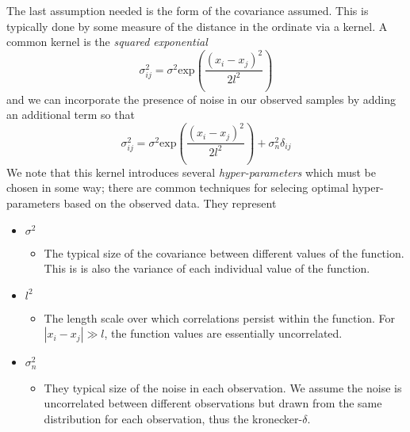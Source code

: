 \documentclass{article}
\begin{document}
The last assumption needed is the form of the covariance assumed. 
This is typically done by some measure of the distance in the ordinate via a kernel.
A common kernel is the \textit{squared exponential}
\begin{equation}
    \sigma_{ij}^2 = \sigma^2 \mathrm{exp}\left(\frac{(x_i - x_j)^2}{2l^2}\right)
\end{equation}
and we can incorporate the presence of noise in our observed samples by adding an additional term so that
\begin{equation}
    \sigma_{ij}^2 = \sigma^2 \mathrm{exp}\left(\frac{(x_i - x_j)^2}{2l^2}\right) + \sigma_{n}^2\delta_{ij}
\end{equation}
We note that this kernel introduces several \textit{hyper-parameters} which must be chosen in some way; there are common techniques for selecing optimal hyper-parameters based on the observed data.
They represent
\begin{itemize}
  \item{$\sigma^2$ 
    \begin{itemize}
      \item{The typical size of the covariance between different values of the function. This is is also the variance of each individual value of the function.}
    \end{itemize}
  }
  \item{$l^2$
    \begin{itemize}
      \item{The length scale over which correlations persist within the function. For $|x_i-x_j|\gg l$, the function values are essentially uncorrelated.}
    \end{itemize}
  }
  \item{$\sigma_n^2$
    \begin{itemize}
      \item{They typical size of the noise in each observation. We assume the noise is uncorrelated between different observations but drawn from the same distribution for each observation, thus the kronecker-$\delta$.}
    \end{itemize}
  }
\end{itemize}
\end{document}
